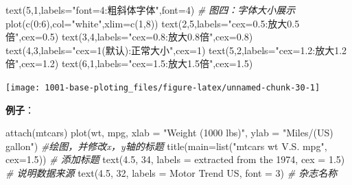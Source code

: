 \documentclass[
]{book}
\newenvironment{Shaded}{\begin{snugshade}}{\end{snugshade}}
\newcommand{\AttributeTok}[1]{\textcolor[rgb]{0.77,0.63,0.00}{#1}}
\newcommand{\CommentTok}[1]{\textcolor[rgb]{0.56,0.35,0.01}{\textit{#1}}}
\newcommand{\DecValTok}[1]{\textcolor[rgb]{0.00,0.00,0.81}{#1}}
\newcommand{\FloatTok}[1]{\textcolor[rgb]{0.00,0.00,0.81}{#1}}
\newcommand{\FunctionTok}[1]{\textcolor[rgb]{0.00,0.00,0.00}{#1}}
\newcommand{\NormalTok}[1]{#1}
\newcommand{\SpecialCharTok}[1]{\textcolor[rgb]{0.00,0.00,0.00}{#1}}
\newcommand{\StringTok}[1]{\textcolor[rgb]{0.31,0.60,0.02}{#1}}
\begin{document}
\begin{Shaded}
\begin{Highlighting}[]
\FunctionTok{text}\NormalTok{(}\DecValTok{5}\NormalTok{,}\DecValTok{1}\NormalTok{,}\AttributeTok{labels=}\StringTok{"font=4:粗斜体字体"}\NormalTok{,}\AttributeTok{font=}\DecValTok{4}\NormalTok{)}
\CommentTok{\# 图四：字体大小展示}
\FunctionTok{plot}\NormalTok{(}\FunctionTok{c}\NormalTok{(}\DecValTok{0}\SpecialCharTok{:}\DecValTok{6}\NormalTok{),}\AttributeTok{col=}\StringTok{"white"}\NormalTok{,}\AttributeTok{xlim=}\FunctionTok{c}\NormalTok{(}\DecValTok{1}\NormalTok{,}\DecValTok{8}\NormalTok{))}
\FunctionTok{text}\NormalTok{(}\DecValTok{2}\NormalTok{,}\DecValTok{5}\NormalTok{,}\AttributeTok{labels=}\StringTok{"cex=0.5:放大0.5倍"}\NormalTok{,}\AttributeTok{cex=}\FloatTok{0.5}\NormalTok{)}
\FunctionTok{text}\NormalTok{(}\DecValTok{3}\NormalTok{,}\DecValTok{4}\NormalTok{,}\AttributeTok{labels=}\StringTok{"cex=0.8:放大0.8倍"}\NormalTok{,}\AttributeTok{cex=}\FloatTok{0.8}\NormalTok{)}
\FunctionTok{text}\NormalTok{(}\DecValTok{4}\NormalTok{,}\DecValTok{3}\NormalTok{,}\AttributeTok{labels=}\StringTok{"cex=1(默认):正常大小"}\NormalTok{,}\AttributeTok{cex=}\DecValTok{1}\NormalTok{)}
\FunctionTok{text}\NormalTok{(}\DecValTok{5}\NormalTok{,}\DecValTok{2}\NormalTok{,}\AttributeTok{labels=}\StringTok{"cex=1.2:放大1.2倍"}\NormalTok{,}\AttributeTok{cex=}\FloatTok{1.2}\NormalTok{)}
\FunctionTok{text}\NormalTok{(}\DecValTok{6}\NormalTok{,}\DecValTok{1}\NormalTok{,}\AttributeTok{labels=}\StringTok{"cex=1.5:放大1.5倍"}\NormalTok{,}\AttributeTok{cex=}\FloatTok{1.5}\NormalTok{)}
\end{Highlighting}
\end{Shaded}

\begin{center}\texttt{[image: 1001-base-ploting\_files/figure-latex/unnamed-chunk-30-1]} \end{center}

\textbf{例子}：

\begin{Shaded}
\begin{Highlighting}[]
\FunctionTok{attach}\NormalTok{(mtcars)}
\FunctionTok{plot}\NormalTok{(wt, mpg, }\AttributeTok{xlab =} \StringTok{"Weight (1000 lbs)"}\NormalTok{, }
     \AttributeTok{ylab =} \StringTok{"Miles/(US) gallon"}\NormalTok{) }\CommentTok{\#绘图，并修改x，y轴的标题}
\FunctionTok{title}\NormalTok{(}\AttributeTok{main=}\FunctionTok{list}\NormalTok{(}\StringTok{"mtcars wt V.S. mpg"}\NormalTok{, }\AttributeTok{cex=}\FloatTok{1.5}\NormalTok{))  }\CommentTok{\# 添加标题}
\FunctionTok{text}\NormalTok{(}\FloatTok{4.5}\NormalTok{, }\DecValTok{34}\NormalTok{, }\AttributeTok{labels =} \StringTok{\textquotesingle{}extracted from the 1974\textquotesingle{}}\NormalTok{, }\AttributeTok{cex =} \FloatTok{1.5}\NormalTok{)  }\CommentTok{\# 说明数据来源}
\FunctionTok{text}\NormalTok{(}\FloatTok{4.5}\NormalTok{, }\DecValTok{32}\NormalTok{, }\AttributeTok{labels =} \StringTok{\textquotesingle{}Motor Trend US\textquotesingle{}}\NormalTok{, }\AttributeTok{font =} \DecValTok{3}\NormalTok{)  }\CommentTok{\# 杂志名称}
\end{Highlighting}
\end{Shaded}
\end{document}
